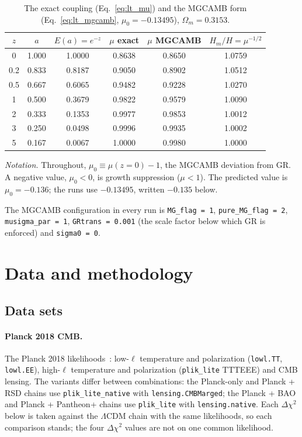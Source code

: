 \begin{table}[htbp]\centering\small
\caption{The exact coupling (Eq.~\ref{eq:lt_mu}) and the MGCAMB form (Eq.~\ref{eq:lt_mgcamb}, $\mu_0=-0.13495$), $\Omega_m=0.3153$. \calc}
\label{tab:lt_mu_compare}
\begin{tabular}{cccccc}\hline
$z$ & $a$ & $E(a)=e^{-z}$ & $\mu$ exact & $\mu$ MGCAMB & $H_m/H=\mu^{-1/2}$\\\hline
0 & 1.000 & 1.0000 & 0.8638 & 0.8650 & 1.0759\\
0.2 & 0.833 & 0.8187 & 0.9050 & 0.8902 & 1.0512\\
0.5 & 0.667 & 0.6065 & 0.9482 & 0.9228 & 1.0270\\
1 & 0.500 & 0.3679 & 0.9822 & 0.9579 & 1.0090\\
2 & 0.333 & 0.1353 & 0.9977 & 0.9853 & 1.0012\\
3 & 0.250 & 0.0498 & 0.9996 & 0.9935 & 1.0002\\
5 & 0.167 & 0.0067 & 1.0000 & 0.9980 & 1.0000\\\hline
\end{tabular}\end{table}

\emph{Notation.} Throughout, $\mu_0\equiv\mu(z{=}0)-1$, the MGCAMB deviation from GR. A negative value, $\mu_0<0$, is growth suppression ($\mu<1$).
The predicted value is $\mu_0=-0.136$; the runs use $-0.13495$, written $-0.135$ below.

The MGCAMB configuration in every run is \texttt{MG\_flag = 1}, \texttt{pure\_MG\_flag = 2}, \texttt{musigma\_par = 1},
\texttt{GRtrans = 0.001} (the scale factor below which GR is enforced) and \texttt{sigma0 = 0}.

\section{Data and methodology}\label{sec:lt_data}
\subsection{Data sets}
\paragraph{Planck 2018 CMB.} The Planck 2018 likelihoods~\cite{Planck2018V,Planck2018VIII}: low-$\ell$ temperature and polarization
(\texttt{lowl.TT}, \texttt{lowl.EE}), high-$\ell$ temperature and polarization (\texttt{plik\_lite} TTTEEE) and CMB lensing. The variants differ
between combinations: the Planck-only and Planck + RSD chains use \texttt{plik\_lite\_native} with \texttt{lensing.CMBMarged}; the Planck + BAO and
Planck + Pantheon+ chains use \texttt{plik\_lite} with \texttt{lensing.native}. Each $\Delta\chi^2$ below is taken against the $\Lambda$CDM chain with the
same likelihoods, so each comparison stands; the four $\Delta\chi^2$ values are not on one common likelihood.

